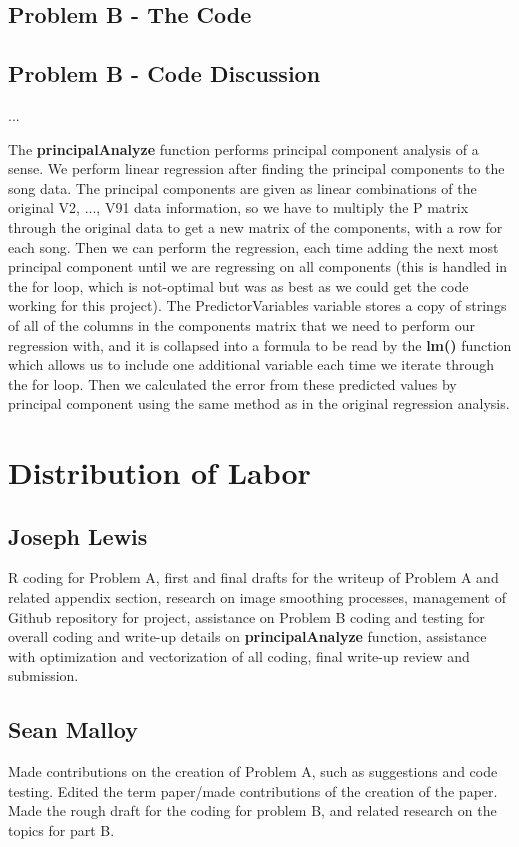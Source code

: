 \documentclass{article}
\begin{document}
\newpage
\subsection{Problem B - The Code}

\subsection{Problem B - Code Discussion}

...

The \textbf{principalAnalyze} function performs principal component analysis of a sense.  We perform linear regression after finding the principal components to the song data.  The principal components are given as linear combinations of the original V2, ..., V91 data information, so we have to multiply the P matrix through the original data to get a new matrix of the components, with a row for each song.  Then we can perform the regression, each time adding the next most principal component until we are regressing on all components (this is handled in the for loop, which is not-optimal but was as best as we could get the code working for this project).  The PredictorVariables variable stores a copy of strings of all of the columns in the components matrix that we need to perform our regression with, and it is collapsed into a formula to be read by the \textbf{lm()} function which allows us to include one additional variable each time we iterate through the for loop.  Then we calculated the error from these predicted values by principal component using the same method as in the original regression analysis.

\newpage
\section{Distribution of Labor}
\subsection{Joseph Lewis} R coding for Problem A, first and final drafts for the writeup of Problem A and related appendix section, research on image smoothing processes, management of Github repository for project, assistance on Problem B coding and testing for overall coding and write-up details on \textbf{principalAnalyze} function, assistance with optimization and vectorization of all coding, final write-up review and submission.

\subsection{Sean Malloy} Made contributions on the creation of Problem A, such as suggestions and code testing. Edited the term paper/made contributions of the creation of the paper. Made the rough draft for the coding for problem B, and related research on the topics for part B.
\end{document}
